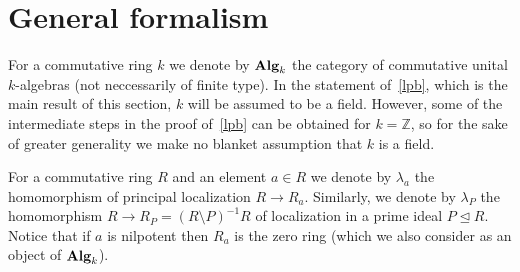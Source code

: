 \documentclass[oneside, 11pt]{amsart} \pdfoutput=1
\newcommand{\K}{{\mathrm{K}}}
\numberwithin{equation}{section}
\theoremstyle{definition}
\newcommand{\ZZ}{\mathbb{Z}}
\newcommand{\catname}[1]{{\normalfont\textbf{#1}}} %
\begin{document}
\section{General formalism}
\begin{comment}
The aim of this section is to formulate and prove Lindel--Popescu Theorem, a certain formal statement, which gives a sufficient condition for a general group-valued functor to be homotopy invariant. Later, in~\cref{sec:main} this result is applied to the functor $K_2$. Some of the machinery developed in this section also will be useful in the study of the $K_2$-analogue of Gersten's conjecture, see~\cref{sec:K2-GC}.

Let us briefly recall the historical context, which might help to explain our choice of the name for~\cref{lpb}. Recall that H.~Lindel's paper~\cite{Li81} has settled the geometric case of the Bass--Quillen conjecture for all regular $k$-algebras $R$ essentially of finite type over $k$. Later T.~Vorst has used Lindel's result in the proof of the homotopy invariance for the unstable $\K_1$-functor, see~\cite{Vo81}. Recall that Vorst's result asserts that $\K_{1,r}(R[t]) \cong \K_{1,r}(R)$ for $r\geq 3$ and a regular ring $R$ essentially finite type over a field. Next, D.~Popescu proved Bass--Quillen conjecture in equicharacteristic case~\cite{Po90}.  Finally, in her recent work~\cite{Sta14} A.~Stavrova has combined Vorst's theorem with a theorem of Popescu and obtained a more general homotopy invariance $\K_1^G(A[t]) \cong \K_1^G(A)$ for an arbitrary regular algebra $A$ over a perfect field $F$ and a sufficiently isotropic reductive group $G$ defined over $F$, see~\cite[Theorem~1.3]{Sta14}.

\subsection{A general Lindel--Popescu-type theorem}
\end{comment}
For a commutative ring $k$ we denote by $\catname{Alg}_k$ the category of commutative unital $k$-algebras (not neccessarily of finite type). In the statement of~\cref{lpb}, which is the main result of this section, $k$ will be assumed to be a field. However, some of the intermediate steps in the proof of~\cref{lpb} can be obtained for $k=\ZZ$, so for the sake of greater generality we make no blanket assumption that $k$ is a field.  

For a commutative ring $R$ and an element $a\in R$ we denote by $\lambda_a$ the homomorphism of principal localization $R \to R_a$. Similarly, we denote by $\lambda_P$ the homomorphism $R \to R_P = (R\setminus P)^{-1}R$ of localization in a prime ideal $P \trianglelefteq R$. Notice that if $a$ is nilpotent then $R_a$ is the zero ring (which we also consider as an object of $\catname{Alg}_k$). 
\end{document}
